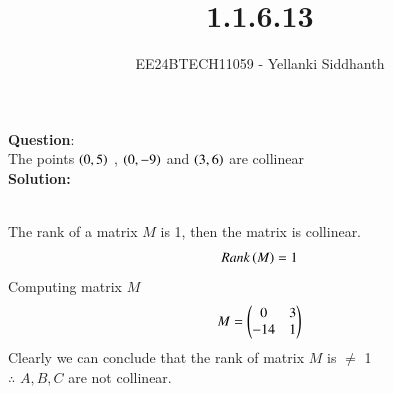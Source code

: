 \documentclass[journal]{IEEEtran}
\begin{document}

\vspace{3cm}

\title{1.1.6.13}
\author{EE24BTECH11059 - Yellanki Siddhanth
}
{\let\newpage\relax\maketitle}

\renewcommand{\thefigure}{\theenumi}
\renewcommand{\thetable}{\theenumi}
\setlength{\intextsep}{10pt} %


\renewcommand{\thetable}{\theenumi}


\textbf{Question}:\\
The points $\left(0,5\right)$ , $\left(0,-9\right)$ and $\left(3,6\right)$ are collinear
\\ \textbf{Solution: }\\
    \begin{table}[h!]    
      \centering
      
      \caption{}
    \end{table}\\
The rank of a matrix $M$ is 1, then the matrix is collinear. 
    \begin{align}
        Rank\left(M\right) = 1\label{eq1.1.6.22.1}
    \end{align}
Computing matrix $M$
    \begin{align}
        M = \begin{pmatrix}0 & 3\\ -14 & 1\end{pmatrix}\label{eq1.1.6.22.2}
    \end{align}
Clearly we can conclude that the rank of matrix $M$ is $\neq$ 1\\ $\therefore$ $A,B,C$ are not collinear.\\
\end{document}

